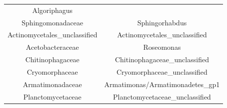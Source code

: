 \documentclass[]{article}
\begin{document}
\begin{longtable}[]{@{}cc@{}}
\begin{minipage}[t]{0.43\columnwidth}
Algoriphagus\strut
\end{minipage}\tabularnewline
\begin{minipage}[t]{0.41\columnwidth}\centering\strut
Sphingomonadaceae\strut
\end{minipage} & \begin{minipage}[t]{0.43\columnwidth}\centering\strut
Sphingorhabdus\strut
\end{minipage}\tabularnewline
\begin{minipage}[t]{0.41\columnwidth}\centering\strut
Actinomycetales\_unclassified\strut
\end{minipage} & \begin{minipage}[t]{0.43\columnwidth}\centering\strut
Actinomycetales\_unclassified\strut
\end{minipage}\tabularnewline
\begin{minipage}[t]{0.41\columnwidth}\centering\strut
Acetobacteraceae\strut
\end{minipage} & \begin{minipage}[t]{0.43\columnwidth}\centering\strut
Roseomonas\strut
\end{minipage}\tabularnewline
\begin{minipage}[t]{0.41\columnwidth}\centering\strut
Chitinophagaceae\strut
\end{minipage} & \begin{minipage}[t]{0.43\columnwidth}\centering\strut
Chitinophagaceae\_unclassified\strut
\end{minipage}\tabularnewline
\begin{minipage}[t]{0.41\columnwidth}\centering\strut
Cryomorphaceae\strut
\end{minipage} & \begin{minipage}[t]{0.43\columnwidth}\centering\strut
Cryomorphaceae\_unclassified\strut
\end{minipage}\tabularnewline
\begin{minipage}[t]{0.41\columnwidth}\centering\strut
Armatimonadaceae\strut
\end{minipage} & \begin{minipage}[t]{0.43\columnwidth}\centering\strut
Armatimonas/Armatimonadetes\_gp1\strut
\end{minipage}\tabularnewline
\begin{minipage}[t]{0.41\columnwidth}\centering\strut
Planctomycetaceae\strut
\end{minipage} & \begin{minipage}[t]{0.43\columnwidth}\centering\strut
Planctomycetaceae\_unclassified\strut

\end{minipage}
\end{longtable}
\end{document}
